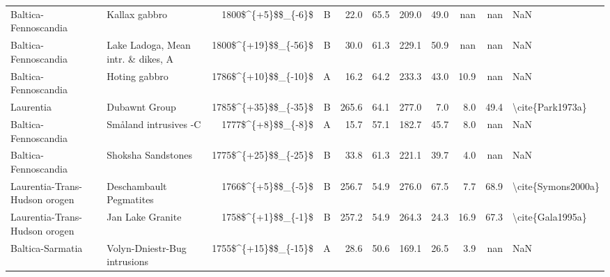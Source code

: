 \begin{longtable}{p{1 in}p{1 in}rrrrrrrr}
          Baltica-Fennoscandia &                                      Kallax gabbro &     1800\$\textasciicircum \{+5\}\$\$\_\{-6\}\$ &      B &      22.0 &      65.5 & 209.0 &  49.0 &       nan &         nan &                                                NaN \\
          Baltica-Fennoscandia &                 Lake Ladoga, Mean intr. \& dikes, A &   1800\$\textasciicircum \{+19\}\$\$\_\{-56\}\$ &      B &      30.0 &      61.3 & 229.1 &  50.9 &       nan &         nan &                                                NaN \\
          Baltica-Fennoscandia &                                      Hoting gabbro &   1786\$\textasciicircum \{+10\}\$\$\_\{-10\}\$ &      A &      16.2 &      64.2 & 233.3 &  43.0 &      10.9 &         nan &                                                NaN \\
                     Laurentia &                                      Dubawnt Group &   1785\$\textasciicircum \{+35\}\$\$\_\{-35\}\$ &      B &     265.6 &      64.1 & 277.0 &   7.0 &       8.0 &        49.4 &                                   \textbackslash cite\{Park1973a\} \\
          Baltica-Fennoscandia &                              Småland intrusives -C &     1777\$\textasciicircum \{+8\}\$\$\_\{-8\}\$ &      A &      15.7 &      57.1 & 182.7 &  45.7 &       8.0 &         nan &                                                NaN \\
          Baltica-Fennoscandia &                                 Shoksha Sandstones &   1775\$\textasciicircum \{+25\}\$\$\_\{-25\}\$ &      B &      33.8 &      61.3 & 221.1 &  39.7 &       4.0 &         nan &                                                NaN \\
 Laurentia-Trans-Hudson orogen &                            Deschambault Pegmatites &     1766\$\textasciicircum \{+5\}\$\$\_\{-5\}\$ &      B &     256.7 &      54.9 & 276.0 &  67.5 &       7.7 &        68.9 &                                 \textbackslash cite\{Symons2000a\} \\
 Laurentia-Trans-Hudson orogen &                                   Jan Lake Granite &     1758\$\textasciicircum \{+1\}\$\$\_\{-1\}\$ &      B &     257.2 &      54.9 & 264.3 &  24.3 &      16.9 &        67.3 &                                   \textbackslash cite\{Gala1995a\} \\
              Baltica-Sarmatia &                       Volyn-Dniestr-Bug intrusions &   1755\$\textasciicircum \{+15\}\$\$\_\{-15\}\$ &      A &      28.6 &      50.6 & 169.1 &  26.5 &       3.9 &         nan &                                                NaN \\

\end{longtable}

